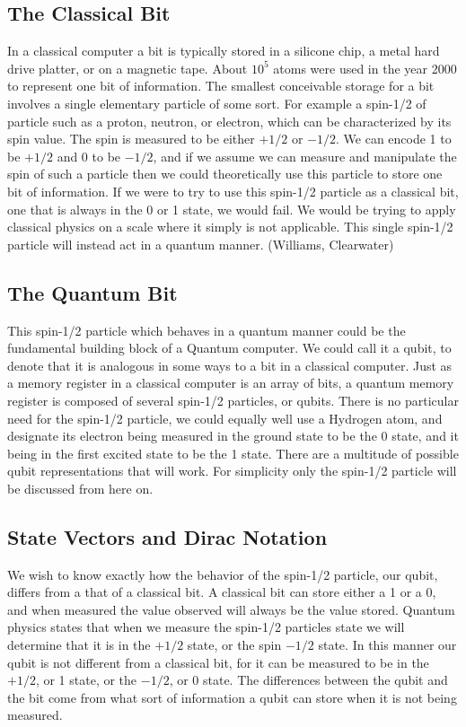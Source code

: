 \documentclass[]{article}
\begin{document}
\subsection{The Classical Bit}

In a classical computer a bit is typically stored in a silicone chip,
a metal hard drive platter, or on a magnetic tape. About $10^{5}$
atoms were used in the year 2000 to represent one bit of
information. The smallest conceivable storage for a bit involves a
single elementary particle of some sort. For example a spin-1/2 of
particle such as a proton, neutron, or electron, which can be
characterized by its spin value.  The spin is measured to be either
$+1/2$ or $-1/2$. We can encode 1 to be $+1/2$ and 0 to be $-1/2$, and
if we assume we can measure and manipulate the spin of such a particle
then we could theoretically use this particle to store one bit of
information. If we were to try to use this spin-1/2 particle as a
classical bit, one that is always in the 0 or 1 state, we would fail.
We would be trying to apply classical physics on a scale where it
simply is not applicable. This single spin-1/2 particle will instead
act in a quantum manner. (Williams, Clearwater)

\subsection{The Quantum Bit}

This spin-1/2 particle which behaves in a quantum manner could be the
fundamental building block of a Quantum computer. We could call it a
qubit, to denote that it is analogous in some ways to a bit in a
classical computer. Just as a memory register in a classical computer
is an array of bits, a quantum memory register is composed of several
spin-1/2 particles, or qubits. There is no particular need for the
spin-1/2 particle, we could equally well use a Hydrogen atom, and
designate its electron being measured in the ground state to be the 0
state, and it being in the first excited state to be the 1 state.
There are a multitude of possible qubit representations that will
work. For simplicity only the spin-1/2 particle will be discussed from
here on.

\subsection{State Vectors and Dirac Notation}

We wish to know exactly how the behavior of the spin-1/2 particle, our
qubit, differs from a that of a classical bit. A classical bit can
store either a 1 or a 0, and when measured the value observed will
always be the value stored. Quantum physics states that when we
measure the spin-1/2 particles state we will determine that it is in
the $+1/2$ state, or the spin $-1/2$ state. In this manner our qubit
is not different from a classical bit, for it can be measured to be in
the $+1/2$, or 1 state, or the $-1/2$, or 0 state. The differences
between the qubit and the bit come from what sort of information a
qubit can store when it is not being measured.
\end{document}
